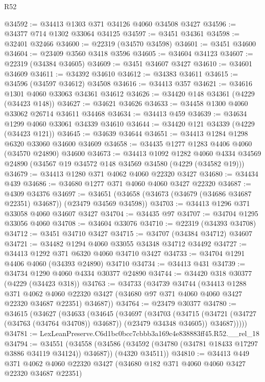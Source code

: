 \begin{lexlean}{R52}
\begin{coremodule}
@34592 := @34413 @1303 @371 @34126 @4060 @34508 @3427
@34596 := @34377 @714 @1302 @33064 @34125
@34597 := @3451 @34361
@34598 := @32401 @32466
@34600 := @22319 (@34570 @34598)
@34601 := @3451 @34600
@34604 := @23409 @3560 @3418 @3596
@34605 := @34604 @34123
@34607 := @22319 (@34384 @34605)
@34609 := @3451 @34607 @3427
@34610 := @34601 @34609
@34611 := @34392 @34610
@34612 := @34383 @34611
@34615 := @34596 (@34597 @34612) @34508
@34616 := @34413 @357
@34621 := @34616 @1301 @4060 @33063 @34361 @34612
@34626 := @34420 @148 @34361 (@4229 (@34423 @148))
@34627 := @34621 @34626
@34633 := @34458 @1300 @4060 @33062 @26714 @34611 @34468
@34634 := @34413 @459
@34639 := @34634 @1299 @4060 @33061 @34339 @34610
@34644 := @34420 @121 @34339 (@4229 (@34423 @121))
@34645 := @34639 @34644
@34651 := @34413 @1284 @1298 @6320 @33060 @34600 @34609
@34658 := @34435 @1277 @1283 @4406 @4060 (@34570 @24890) @34600
@34673 := @34413
    @1092
    @1282
    @4060
    @4334
    @34569
    @24890
    (@34567 @19 @34572 @148 @34569 @34580 (@4229 (@34582 @19)))
@34679 := @34413 @1280 @371 @4062 @4060 @22320 @3427
@34680 := @34434 @439
@34686 := @34680 @1277 @371 @4060 @4060 @3427 @22320
@34687 := @4309 @34376
@34697 := @34651 (@34658 (@34673 (@34679 (@34686 @34687 @22351) @34687)) (@23479 @34569 @34598))
@34703 := @34413 @1296 @371 @33058 @4060 @34607 @3427
@34704 := @34435 @97
@34707 := @34704 @1295 @33056 @4060
@34708 := @34604 @33076
@34710 := @22319 (@34393 @34708)
@34712 := @3451 @34710 @3427
@34715 := @34707 (@34384 @34712) @34607
@34721 := @34482 @1294 @4060 @33055 @34348 @34712 @34492
@34727 := @34413 @1292 @371 @6320 @4060 @34710 @3427
@34733 := @34704 @1291 @4406 @4060 (@34393 @24890) @34710
@34734 := @34413 @431
@34739 := @34734 @1290 @4060 @4334 @30377 @24890
@34744 := @34420 @318 @30377 (@4229 (@34423 @318))
@34763 := @34733
    (@34739
      @34744
      (@34413
        @1288
        @371
        @4062
        @4060
        @22320
        @3427
        (@34680 @97 @371 @4060 @4060 @3427 @22320 @34687 @22351)
        @34687))
@34764 := @23479 @30377
@34780 := @34615
    (@34627
      (@34633
        (@34645
          (@34697
            (@34703
              (@34715 (@34721 (@34727 (@34763 (@34764 @34708)) @34687)) (@23479 @34348 @34605))
              @34687)))))
@34781 := LexLeanPreserve.C6d1bc0bcc7cbbb3a169c4e838883ff45.R52.__rel_18
@34794 := @34551
    (@34558
      (@34586 (@34592 (@34780 (@34781 @18433 @17297 @3886 @34119 @34124)) @34687))
      (@4320 @34511))
@34810 := @34413
    @449
    @371
    @4062
    @4060
    @22320
    @3427
    (@34680 @182 @371 @4060 @4060 @3427 @22320 @34687 @22351)

\end{coremodule}
\end{lexlean}
